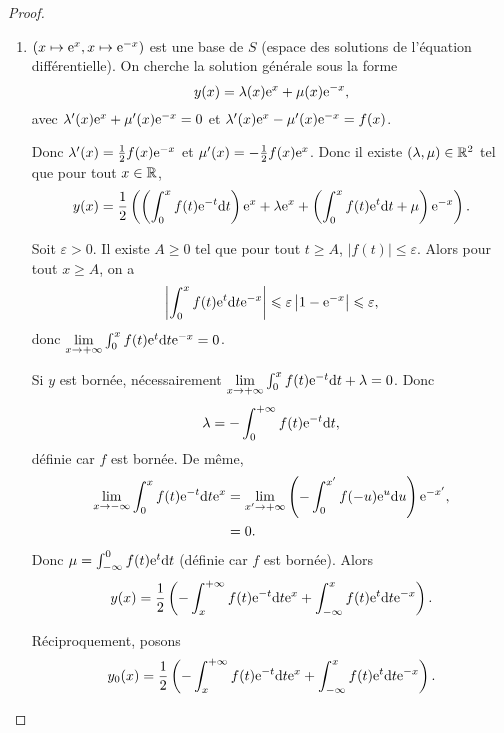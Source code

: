 \documentclass[12pt]{article}
\begin{document}
\begin{proof}
	\phantom{}
	\begin{enumerate}
		\item $(x\mapsto\mathrm{e}^{x},x\mapsto\mathrm{e}^{-x})$ est une base de $S$ (espace des solutions de l'équation différentielle). On cherche la solution générale sous la forme 
		\begin{equation*}
			y(x)=\lambda(x)\mathrm{e}^{x}+\mu(x)\mathrm{e}^{-x},
		\end{equation*}
		avec $\lambda'(x)\mathrm{e}^{x}+\mu'(x)\mathrm{e}^{-x}=0$ et $\lambda'(x)\mathrm{e}^{x}-\mu'(x)\mathrm{e}^{-x}=f(x)$.

		Donc $\lambda'(x)=\frac{1}{2}f(x)\mathrm{e}^{-x}$ et $\mu'(x)=-\frac{1}{2}f(x)\mathrm{e}^{x}$. Donc il existe $(\lambda,\mu)\in\mathbb{R}^{2}$ tel que pour tout $x\in\mathbb{R}$,
		\begin{equation*}
			y(x)=\frac{1}{2}\left(\left(\int_{0}^{x}f(t)\mathrm{e}^{-t}\mathrm{d} t\right)\mathrm{e}^{x}+\lambda\mathrm{e}^{x}+\left(\int_{0}^{x}f(t)\mathrm{e}^{t}\mathrm{d} t+\mu\right)\mathrm{e}^{-x}\right).
		\end{equation*}

		Soit $\varepsilon>0$. Il existe $A\geqslant0$ tel que pour tout $t\geqslant A$, $\left\lvert f(t)\right\rvert\leqslant\varepsilon$. Alors pour tout $x\geqslant A$, on a 
		\begin{equation*}
			\left\lvert\int_{0}^{x}f(t)\mathrm{e}^{t}\mathrm{d} t\mathrm{e}^{-x}\right\rvert\leqslant\varepsilon\left\lvert 1-\mathrm{e}^{-x}\right\rvert\leqslant\varepsilon,
		\end{equation*}
		donc $\lim\limits_{x\to+\infty}\int_{0}^{x}f(t)\mathrm{e}^{t}\mathrm{d} t\mathrm{e}^{-x}=0$.

		Si $y$ est bornée, nécessairement $\lim\limits_{x\to+\infty}\int_{0}^{x}f(t)\mathrm{e}^{-t}\mathrm{d} t+\lambda=0$. Donc 
		\begin{equation*}
			\lambda=-\int_{0}^{+\infty}f(t)\mathrm{e}^{-t}\mathrm{d} t,
		\end{equation*}
		définie car $f$ est bornée. De même, 
		\begin{align*}
			\lim\limits_{x\to-\infty}\int_{0}^{x}f(t)\mathrm{e}^{-t}\mathrm{d} t\mathrm{e}^{x}
			&=\lim\limits_{x'\to+\infty}\left(-\int_{0}^{x'}f(-u)\mathrm{e}^{u}\mathrm{d} u\right)\mathrm{e}^{-x'},\\
			&=0.
		\end{align*}
		Donc $\mu=\int_{-\infty}^{0}f(t)\mathrm{e}^{t}\mathrm{d} t$ (définie car $f$ est bornée). Alors 
		\begin{equation*}
			y(x)=\frac{1}{2}\left(-\int_{x}^{+\infty}f(t)\mathrm{e}^{-t}\mathrm{d} t\mathrm{e}^{x}+\int_{-\infty}^{x}f(t)\mathrm{e}^{t}\mathrm{d} t\mathrm{e}^{-x}\right).
		\end{equation*}

		Réciproquement, posons 
		\begin{equation*}
			y_0(x)=\frac{1}{2}\left(-\int_{x}^{+\infty}f(t)\mathrm{e}^{-t}\mathrm{d} t\mathrm{e}^{x}+\int_{-\infty}^{x}f(t)\mathrm{e}^{t}\mathrm{d} t\mathrm{e}^{-x}\right).
		\end{equation*}


\end{enumerate}
\end{proof}
\end{document}
